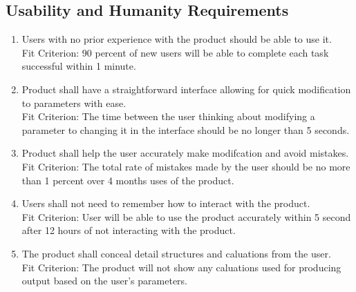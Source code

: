 \documentclass[12pt, titlepage]{article}
\begin{document}
\subsection{Usability and Humanity Requirements}
\begin{adjustwidth}{2.2em}{0pt}
\begin{enumerate}[{NFR-U}1.]
  \item Users with no prior experience with the product should be able to use it.\\
  Fit Criterion: 90 percent of new users will be able to complete each task successful within 1 minute. 
  \item Product shall have a straightforward interface allowing for quick modification to parameters with ease.\\
  Fit Criterion: The time between the user thinking about modifying a parameter to changing it in the interface should be no longer than 5 seconds.
  \item Product shall help the user accurately make modifcation and avoid mistakes.\\
  Fit Criterion: The total rate of mistakes made by the user should be no more than 1 percent over 4 months uses of the product. 
  \item Users shall not need to remember how to interact with the product.\\
  Fit Criterion: User will be able to use the product accurately within 5 second after 12 hours of not interacting with the product.
  \item The product shall conceal detail structures and caluations from the user.\\
  Fit Criterion: The product will not show any caluations used for producing output based on the user's parameters.
\end{enumerate}
\end{adjustwidth}
\end{document}

